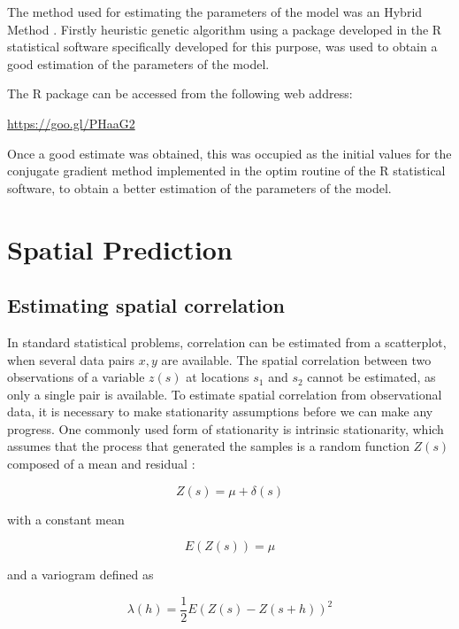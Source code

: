 \documentclass[11pt,twoside]{rmta2010esp}%
\begin{document}
The method used for estimating the parameters of the model was an Hybrid Method \cite{McNelis2005}. Firstly heuristic genetic algorithm using a package developed in the R statistical software \cite{rproject} specifically developed for this purpose, was used to obtain a good estimation of the parameters of the model. 

The R package can be accessed from the following web address:
 
\url{https://goo.gl/PHaaG2}


Once a good estimate was obtained, this was occupied as the initial values for the conjugate gradient method implemented in the optim routine of the R statistical software, to obtain a better estimation of the parameters of the model.  


\section{Spatial Prediction}

\subsection*{Estimating spatial correlation}

In standard statistical problems, correlation can be estimated from a scatterplot, when several data pairs ${x, y}$ are available. The spatial correlation between two observations of a variable $z(s)$ at locations $s_{1}$ and $s_{2}$ cannot be estimated, as only a single pair is available. To estimate spatial correlation
from observational data, it is necessary to make stationarity assumptions
before we can make any progress. One commonly used form of stationarity
is intrinsic stationarity, which assumes that the process that generated the
samples is a random function $Z(s)$ composed of a mean and residual \cite{bivand2008applied}:

\begin{equation}
Z(s) = \mu + \delta(s)
\end{equation}

with a constant mean 

\begin{equation}
E\left(Z(s)\right) = \mu
\end{equation}

and a variogram defined as 

\begin{equation}
\lambda(h) = \frac{1}{2}E\left(Z(s) - Z(s+h)\right)^{2}
\end{equation}
\end{document}
